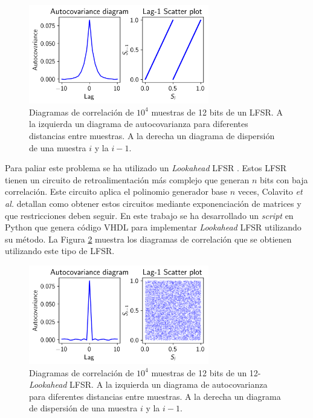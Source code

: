 \begin{figure}[h]
    \centering
    \includegraphics[width=0.7\textwidth]{root/Imagenes/5_riscv/lfsr_bar_corr.png}
    \caption{Diagramas de correlación de $10^4$ muestras de 12 bits de un LFSR. A la izquierda un diagrama de autocovarianza para diferentes distancias entre muestras. A la derecha un diagrama de dispersión de una muestra $i$ y la $i-1$.}
    \label{fig:lfsr_bar_corr}
\end{figure}

Para paliar este problema se ha utilizado un \textit{Lookahead} LFSR \cite{look_ahead_lfsr_base}. Estos LFSR tienen un circuito de retroalimentación más complejo que generan $n$ bits con baja correlación. Este circuito aplica el polinomio generador base $n$ veces, Colavito \emph{et al.} \cite{look_ahead_lfsr_design} detallan como obtener estos circuitos mediante exponenciación de matrices y que restricciones deben seguir. En este trabajo se ha desarrollado un \textit{script} en Python que genera código VHDL para implementar \textit{Lookahead} LFSR utilizando su método. La Figura \ref{fig:lfsr_good_corr} muestra los diagramas de correlación que se obtienen utilizando este tipo de LFSR.

\begin{figure}[h]
    \centering
    \includegraphics[width=0.7\textwidth]{root/Imagenes/5_riscv/lfsr_good_corr.png}
    \caption{Diagramas de correlación de $10^4$ muestras de 12 bits de un 12-\textit{Lookahead} LFSR. A la izquierda un diagrama de autocovarianza para diferentes distancias entre muestras. A la derecha un diagrama de dispersión de una muestra $i$ y la $i-1$.}
    \label{fig:lfsr_good_corr}
\end{figure}

